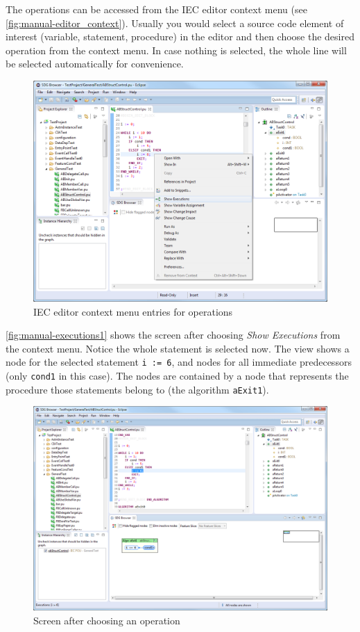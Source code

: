 The \SB operations can be accessed from the IEC editor context menu (see \autoref{fig:manual-editor_context}). Usually 
you would select a source code element of interest (variable, statement, procedure) in the editor and then choose the 
desired operation from the context menu. In case nothing is selected, the whole line will be selected automatically for 
convenience.

\begin{figure}[htp]
  \centering
    \includegraphics[width=\textwidth]{bilder/manual-editor_context}
  \caption{IEC editor context menu entries for \SB operations}
  \label{fig:manual-editor_context}
\end{figure}

\autoref{fig:manual-executions1} shows the screen after choosing \emph{Show Executions} from the context menu. Notice 
the whole statement is selected now. The \SB view shows a node for the selected statement \lstinline|i := 6|, and nodes 
for all immediate predecessors (only \lstinline|cond1| in this case). The nodes are contained by a node that represents 
the procedure those statements belong to (the algorithm \lstinline|aExit1|).

\begin{figure}[htp]
  \centering
    \includegraphics[width=\textwidth]{bilder/manual-executions1}
  \caption{Screen after choosing an \SB operation}
  \label{fig:manual-executions1}
\end{figure}

